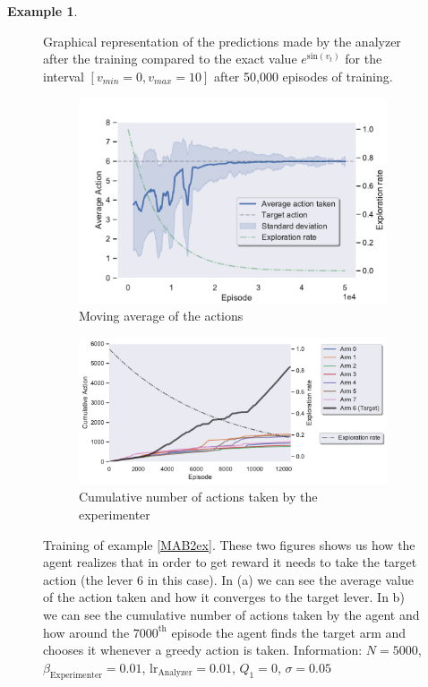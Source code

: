 \documentclass[11pt,a4paper,twoside]{report}
\newcommand{\+}{\textnormal{+} }
\theoremstyle{definition}
\newtheorem{myex}[mythm]{Example}
\numberwithin{equation}{chapter}
\begin{document}
\begin{myex}
\begin{figure}
      \caption{Graphical representation of the predictions made by the analyzer
      after the training compared to the exact value $e^{\text{sin}(v_t)}$ for 
      the interval $[v_{min}=0,v_{max}=10]$ after 50,000 episodes of training.}
      \label{performanceMBA2}
    \end{figure}


    \begin{figure}[]
      \centering
      \begin{subfigure}{.5\textwidth}
        \centering
        \includegraphics[width=1\linewidth]{figures/Actions-MAB2.pdf}
        \caption{Moving average of the actions}
        \label{fig:ActionAverageMAB2}
      \end{subfigure}%
      \begin{subfigure}{.5\textwidth}
        \centering
        \includegraphics[width=1\linewidth]{figures/Cum-action-MAB2.pdf}
        \caption{Cumulative number of actions taken by the experimenter}
        \label{fig:actionsMAB2}
      \end{subfigure}
      \caption{Training of example \ref{MAB2ex}. These two figures shows us how
      the agent realizes that in order to get reward it needs to take the target
      action (the lever 6 in this case). In (a) we can see the average value of
      the action taken and how it converges to the target lever. In b) we can
      see the cumulative number of actions taken by the agent and how around the
      $7000^\text{th}$ episode the agent finds the target arm and chooses it
      whenever a greedy action is taken. Information: $N=5000$,
      $\beta_\text{Experimenter}=0.01$, $\text{lr}_\text{Analyzer}=0.01$,
      $Q_1=0$, $\sigma=0.05$}
    \end{figure}


\end{myex}
\end{document}
